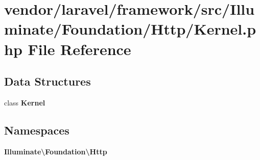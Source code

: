 \section{vendor/laravel/framework/src/\+Illuminate/\+Foundation/\+Http/\+Kernel.php File Reference}
\label{vendor_2laravel_2framework_2src_2_illuminate_2_foundation_2_http_2_kernel_8php}
\subsection*{Data Structures}
\begin{DoxyCompactItemize}
\item 
class {\bf Kernel}
\end{DoxyCompactItemize}
\subsection*{Namespaces}
\begin{DoxyCompactItemize}
\item 
 {\bf Illuminate\textbackslash{}\+Foundation\textbackslash{}\+Http}
\end{DoxyCompactItemize}
